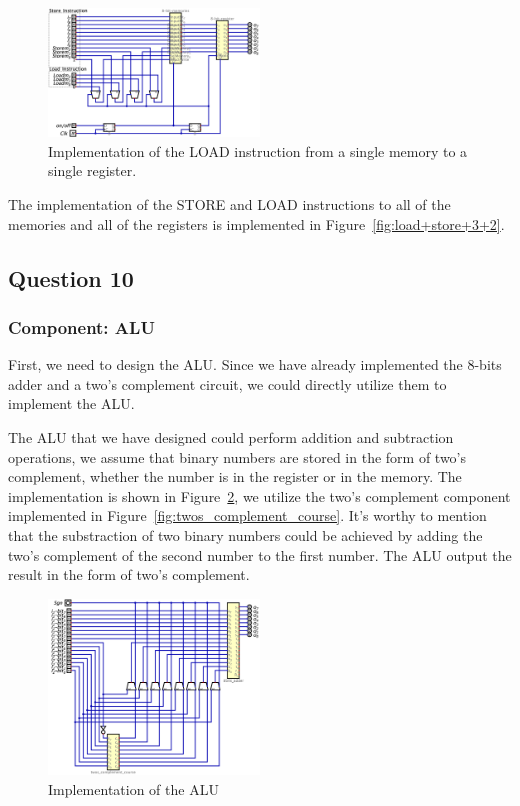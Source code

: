 \documentclass[conference]{IEEEtran}
\begin{document}
\begin{figure}[h!]
    \centering
    \includegraphics[width=0.5\textwidth]{assets/load.png}
    \caption{Implementation of the LOAD instruction from a single memory to a single register.}
    \label{fig:load}
\end{figure}


The implementation of the STORE and LOAD instructions to all of the memories and all of the registers is implemented in Figure~\ref{fig:load+store+3+2}.



\subsection{Question 10}

\subsubsection{Component: ALU}
First, we need to design the ALU. Since we have already implemented the 8-bits adder and a two's complement circuit, we could directly utilize them to implement the ALU.

The ALU that we have designed could perform addition and subtraction operations, we assume that binary numbers are stored in the form of two's complement, whether the number is in the register or in the memory.
The implementation is shown in Figure~\ref{fig:alu}, we utilize the two's complement component implemented in Figure~\ref{fig:twos_complement_course}. It's worthy to mention that the substraction of two binary numbers could be achieved by adding the two's complement of the second number to the first number. The ALU output the result in the form of two's complement.




\begin{figure}[h!]
    \centering
    \includegraphics[width=0.5\textwidth]{assets/alu.png}
    \caption{Implementation of the ALU}
    \label{fig:alu}
\end{figure}
\end{document}
